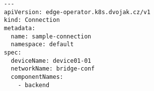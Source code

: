 \begin{lstfloat}
\begin{lstlisting}[style=mybashstyle, caption={Ukázka CRD Connection}, label={sample:connection}]
---
apiVersion: edge-operator.k8s.dvojak.cz/v1
kind: Connection
metadata:
  name: sample-connection
  namespace: default
spec:
  deviceName: device01-01
  networkName: bridge-conf
  componentNames:
    - backend
\end{lstlisting}
\end{lstfloat}